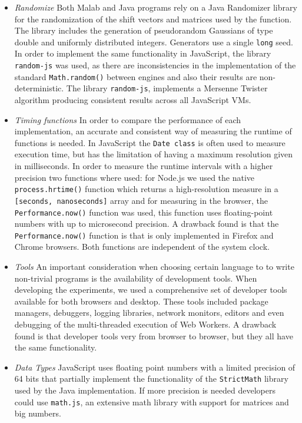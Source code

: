 \documentclass[journal,onecolumn]{IEEEtran}
\begin{document}
\begin{itemize}
\item {\em Randomize} Both Malab and Java programs rely on a 
Java Randomizer library for the 
randomization of the shift vectors and matrices used by the function.
The library includes the generation of pseudorandom Gaussians of type
double and uniformly distributed integers. Generators use a single
{\tt long} seed. In order to implement the same functionality in
JavaScript, the library {\tt random-js} was used, as there are inconsistencies 
in the implementation of the standard {\tt Math.random()} between engines
and also their results are non-deterministic. 
The library {\tt random-js}, implements a Mersenne Twister algorithm producing 
consistent results across all JavaScript VMs.
\item {\em Timing functions} In order to compare the performance of 
each implementation, an accurate and consistent way of measuring 
the runtime of functions is needed.
In JavaScript the {\tt Date class} is often used 
to measure execution time, but has the limitation of having a maximum 
resolution given in milliseconds.
In order to measure the runtime intervals with a higher precision two functions
where used: for Node.js we used the native {\tt process.hrtime()} function
which returns a high-resolution measure in a {\tt [seconds, nanoseconds]}
array and for measuring in the browser, the {\tt Performance.now()} function was used,
this function uses floating-point numbers with up to microsecond precision. 
A drawback found is that the {\tt Performance.now()} function is that is only implemented
in Firefox and Chrome browsers. Both functions are independent of the system clock. 
\item {\em Tools} An important consideration when choosing certain language to 
to write non-trivial programs is the availability of development tools. When developing
the experiments, we used a comprehensive set of developer tools available for both
browsers and desktop. These tools included package managers, debuggers, logging libraries, 
network monitors, editors and even debugging of the multi-threaded execution of Web Workers.
A drawback found is that developer tools very from browser to browser, 
but they all have the same functionality.
\item {\em Data Types} JavaScript uses floating point numbers with a 
limited precision of 64 bits that partially implement the functionality of
the {\tt StrictMath} library used by the Java implementation. If more precision
is needed developers could use {\tt math.js}, an extensive math library with
support for matrices and big numbers.
\end{itemize}
\end{document}
